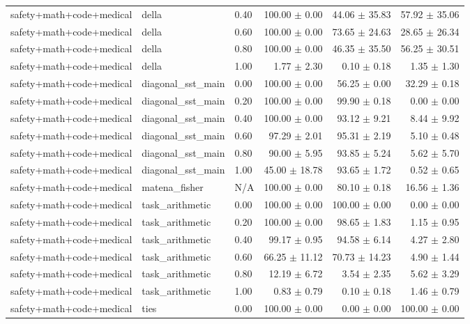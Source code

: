 \documentclass{article}
\begin{document}
\begin{table}[H]
{\begin{tabular}{lllrrr}
safety+math+code+medical & della & 0.40 & 100.00 $\pm$ 0.00 & 44.06 $\pm$ 35.83 & 57.92 $\pm$ 35.06 \\
safety+math+code+medical & della & 0.60 & 100.00 $\pm$ 0.00 & 73.65 $\pm$ 24.63 & 28.65 $\pm$ 26.34 \\
safety+math+code+medical & della & 0.80 & 100.00 $\pm$ 0.00 & 46.35 $\pm$ 35.50 & 56.25 $\pm$ 30.51 \\
safety+math+code+medical & della & 1.00 & 1.77 $\pm$ 2.30 & 0.10 $\pm$ 0.18 & 1.35 $\pm$ 1.30 \\
safety+math+code+medical & diagonal\_sst\_main & 0.00 & 100.00 $\pm$ 0.00 & 56.25 $\pm$ 0.00 & 32.29 $\pm$ 0.18 \\
safety+math+code+medical & diagonal\_sst\_main & 0.20 & 100.00 $\pm$ 0.00 & 99.90 $\pm$ 0.18 & 0.00 $\pm$ 0.00 \\
safety+math+code+medical & diagonal\_sst\_main & 0.40 & 100.00 $\pm$ 0.00 & 93.12 $\pm$ 9.21 & 8.44 $\pm$ 9.92 \\
safety+math+code+medical & diagonal\_sst\_main & 0.60 & 97.29 $\pm$ 2.01 & 95.31 $\pm$ 2.19 & 5.10 $\pm$ 0.48 \\
safety+math+code+medical & diagonal\_sst\_main & 0.80 & 90.00 $\pm$ 5.95 & 93.85 $\pm$ 5.24 & 5.62 $\pm$ 5.70 \\
safety+math+code+medical & diagonal\_sst\_main & 1.00 & 45.00 $\pm$ 18.78 & 93.65 $\pm$ 1.72 & 0.52 $\pm$ 0.65 \\
safety+math+code+medical & matena\_fisher & N/A & 100.00 $\pm$ 0.00 & 80.10 $\pm$ 0.18 & 16.56 $\pm$ 1.36 \\
safety+math+code+medical & task\_arithmetic & 0.00 & 100.00 $\pm$ 0.00 & 100.00 $\pm$ 0.00 & 0.00 $\pm$ 0.00 \\
safety+math+code+medical & task\_arithmetic & 0.20 & 100.00 $\pm$ 0.00 & 98.65 $\pm$ 1.83 & 1.15 $\pm$ 0.95 \\
safety+math+code+medical & task\_arithmetic & 0.40 & 99.17 $\pm$ 0.95 & 94.58 $\pm$ 6.14 & 4.27 $\pm$ 2.80 \\
safety+math+code+medical & task\_arithmetic & 0.60 & 66.25 $\pm$ 11.12 & 70.73 $\pm$ 14.23 & 4.90 $\pm$ 1.44 \\
safety+math+code+medical & task\_arithmetic & 0.80 & 12.19 $\pm$ 6.72 & 3.54 $\pm$ 2.35 & 5.62 $\pm$ 3.29 \\
safety+math+code+medical & task\_arithmetic & 1.00 & 0.83 $\pm$ 0.79 & 0.10 $\pm$ 0.18 & 1.46 $\pm$ 0.79 \\
safety+math+code+medical & ties & 0.00 & 100.00 $\pm$ 0.00 & 0.00 $\pm$ 0.00 & 100.00 $\pm$ 0.00 \\

\end{tabular}}
\end{table}
\end{document}
